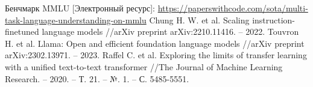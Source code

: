 \begin{thebibliography}{99}
  Бенчмарк MMLU [Электронный ресурс]: \url{https://paperswithcode.com/sota/multi-task-language-understanding-on-mmlu}
  Chung H. W. et al. Scaling instruction-finetuned language models //arXiv preprint arXiv:2210.11416. – 2022.
  Touvron H. et al. Llama: Open and efficient foundation language models //arXiv preprint arXiv:2302.13971. – 2023.
  Raffel C. et al. Exploring the limits of transfer learning with a unified text-to-text transformer //The Journal of Machine Learning Research. – 2020. – Т. 21. – №. 1. – С. 5485-5551.
\end{thebibliography}
